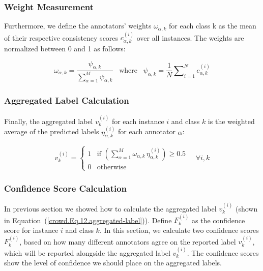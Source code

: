 \documentclass[pdflatex,bst/sn-basic]{bst/sn-jnl}%
\begin{document}
\subsubsection{Weight Measurement}

Furthermore, we define the annotators' weights $\omega_{\alpha,k}$ for each class k as the mean of their respective consistency scores $c_{\alpha,k}^{(i)} $ over all instances. The weights are normalized between 0 and 1 as follows:

\begin{equation}
    \omega_{\alpha,k}=\frac{\psi_{\alpha,k}}{\sum_{\alpha=1}^ M\psi_{\alpha,k}}\;\;\;\text{where}\;\;\; \psi_{\alpha,k}=\frac1N\sum\nolimits_{i=1}^{N}c_{\alpha,k}^{(i)}
    \label{crowd.Eq.11.weights}
\end{equation}

\subsubsection{Aggregated Label Calculation}

Finally, the aggregated label $v_k^{(i)} $ for each instance $i $ and class $k $ is the weighted average of the predicted labels $\eta_{\alpha,k}^{(i)} $ for each annotator $\alpha $:

\begin{equation}
    v_k^{(i)} =
    \begin{cases}
        1 & \text{if } \left(\sum_{\alpha=1}^{M} \omega_{\alpha,k}\, \eta_{\alpha,k}^{(i)}\right) \geq 0.5 \\
        0 & \text{otherwise}
    \end{cases}
    \quad \forall i, k
    \label{crowd.Eq.12.aggregated-label}
\end{equation}

\subsubsection{Confidence Score Calculation}

In previous section we showed how to calculate the aggregated label $v_k^{(i)} $ (shown in Equation~(\ref{crowd.Eq.12.aggregated-label})). Define $F_k^{(i)} $ as the confidence score for instance $i $ and class $k $. In this section, we calculate two confidence scores $F_k^{(i)} $, based on how many different annotators agree on the reported label $v_k^{(i)} $, which will be reported alongside the aggregated label $v_k^{(i)} $. The confidence scores show the level of confidence we should place on the aggregated labels.
\end{document}
